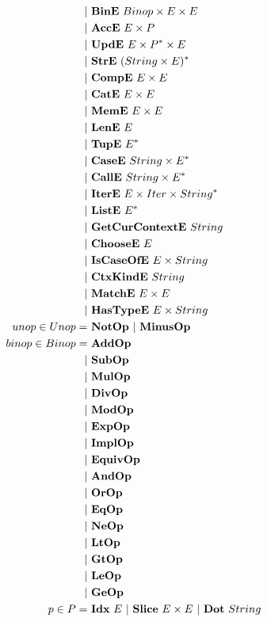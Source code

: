 \begin{align*}
    | & ~ \bine ~ Binop \times E \times E \\
    | & ~ \acce ~ E \times P \\
    | & ~ \upde ~ E \times \seq P \times E \\
    | & ~ \stre ~ \seq{(String \times E)} \\
    | & ~ \compe ~ E \times E \\
    | & ~ \cate ~ E \times E \\
    | & ~ \meme ~ E \times E \\
    | & ~ \lene ~ E \\
    | & ~ \tupe ~ \seq E \\
    | & ~ \casee ~ String \times \seq E \\
    | & ~ \calle ~ String \times \seq E \\
    | & ~ \itere ~ E \times Iter \times \seq{String} \\
    | & ~ \liste ~ \seq E \\
    | & ~ \getcurctxe ~ String \\
    | & ~ \choosee ~ E \\
    | & ~ \iscaseofe ~ E \times String \\
    | & ~ \ctxkinde ~ String \\
    | & ~ \matche ~ E \times E \\
    | & ~ \hastypee ~ E \times String \\
%
  unop \in Unop =& ~ \notop ~ | ~ \minusop \\
  binop \in Binop =& ~ \addop \\
    | & ~ \subop \\
    | & ~ \mulop \\
    | & ~ \divop \\
    | & ~ \modop \\
    | & ~ \expop \\
    | & ~ \implop \\
    | & ~ \equivop \\
    | & ~ \andop \\
    | & ~ \orop \\
    | & ~ \eqop \\
    | & ~ \neop \\
    | & ~ \ltop \\
    | & ~ \gtop \\
    | & ~ \leop \\
    | & ~ \geop \\
%
  p \in P =& ~ \idxp ~ E ~ | ~ \slicep ~ E \times E ~ | ~ \dotp ~ String \\

\end{align*}
